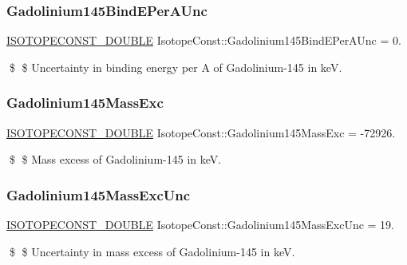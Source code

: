 \subsubsection{\texorpdfstring{Gadolinium145\+Bind\+E\+Per\+A\+Unc}{Gadolinium145BindEPerAUnc}}
{\footnotesize\ttfamily \mbox{\hyperlink{group___isotope_const-_macros_ga8f45a7272ce02c0b4c65c44636ed719a}{I\+S\+O\+T\+O\+P\+E\+C\+O\+N\+S\+T\+\_\+\+D\+O\+U\+B\+LE}} Isotope\+Const\+::\+Gadolinium145\+Bind\+E\+Per\+A\+Unc = 0.}

\$ \$ Uncertainty in binding energy per A of Gadolinium-\/145 in keV. \mbox{\label{group___isotope_const-_gadolinium-_gd145_gaeb56edd93a2271f0e81c4d6e9f40ceb8}} 
\subsubsection{\texorpdfstring{Gadolinium145\+Mass\+Exc}{Gadolinium145MassExc}}
{\footnotesize\ttfamily \mbox{\hyperlink{group___isotope_const-_macros_ga8f45a7272ce02c0b4c65c44636ed719a}{I\+S\+O\+T\+O\+P\+E\+C\+O\+N\+S\+T\+\_\+\+D\+O\+U\+B\+LE}} Isotope\+Const\+::\+Gadolinium145\+Mass\+Exc = -\/72926.}

\$ \$ Mass excess of Gadolinium-\/145 in keV. \mbox{\label{group___isotope_const-_gadolinium-_gd145_ga1a4c9355b50be6651ff760c147f2fe98}} 
\subsubsection{\texorpdfstring{Gadolinium145\+Mass\+Exc\+Unc}{Gadolinium145MassExcUnc}}
{\footnotesize\ttfamily \mbox{\hyperlink{group___isotope_const-_macros_ga8f45a7272ce02c0b4c65c44636ed719a}{I\+S\+O\+T\+O\+P\+E\+C\+O\+N\+S\+T\+\_\+\+D\+O\+U\+B\+LE}} Isotope\+Const\+::\+Gadolinium145\+Mass\+Exc\+Unc = 19.}

\$ \$ Uncertainty in mass excess of Gadolinium-\/145 in keV. \mbox{\label{group___isotope_const-_gadolinium-_gd145_ga7203ae52f03f0ca1222a823f6eb887d5}} 
